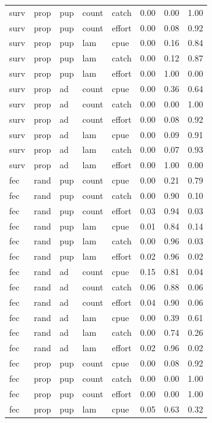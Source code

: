 \documentclass[nonumbib,leqno]{nrc1}
\begin{document}
\begin{longtable}{lllllrrr}
  surv & prop & pup & count & catch & 0.00 & 0.00 & 1.00 \\
  surv & prop & pup & count & effort & 0.00 & 0.08 & 0.92 \\
  surv & prop & pup & lam & cpue & 0.00 & 0.16 & 0.84 \\
  surv & prop & pup & lam & catch & 0.00 & 0.12 & 0.87 \\
  surv & prop & pup & lam & effort & 0.00 & 1.00 & 0.00 \\
  surv & prop & ad & count & cpue & 0.00 & 0.36 & 0.64 \\
  surv & prop & ad & count & catch & 0.00 & 0.00 & 1.00 \\
  surv & prop & ad & count & effort & 0.00 & 0.08 & 0.92 \\
  surv & prop & ad & lam & cpue & 0.00 & 0.09 & 0.91 \\
  surv & prop & ad & lam & catch & 0.00 & 0.07 & 0.93 \\
  surv & prop & ad & lam & effort & 0.00 & 1.00 & 0.00 \\
  fec & rand & pup & count & cpue & 0.00 & 0.21 & 0.79 \\
  fec & rand & pup & count & catch & 0.00 & 0.90 & 0.10 \\
  fec & rand & pup & count & effort & 0.03 & 0.94 & 0.03 \\
  fec & rand & pup & lam & cpue & 0.01 & 0.84 & 0.14 \\
  fec & rand & pup & lam & catch & 0.00 & 0.96 & 0.03 \\
  fec & rand & pup & lam & effort & 0.02 & 0.96 & 0.02 \\
  fec & rand & ad & count & cpue & 0.15 & 0.81 & 0.04 \\
  fec & rand & ad & count & catch & 0.06 & 0.88 & 0.06 \\
  fec & rand & ad & count & effort & 0.04 & 0.90 & 0.06 \\
  fec & rand & ad & lam & cpue & 0.00 & 0.39 & 0.61 \\
  fec & rand & ad & lam & catch & 0.00 & 0.74 & 0.26 \\
  fec & rand & ad & lam & effort & 0.02 & 0.96 & 0.02 \\
  fec & prop & pup & count & cpue & 0.00 & 0.08 & 0.92 \\
  fec & prop & pup & count & catch & 0.00 & 0.00 & 1.00 \\
  fec & prop & pup & count & effort & 0.00 & 0.00 & 1.00 \\
  fec & prop & pup & lam & cpue & 0.05 & 0.63 & 0.32 \\

\end{longtable}
\end{document}
